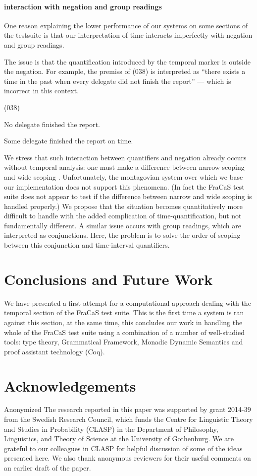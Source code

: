 \documentclass[a4paper,11pt]{article}
\newcommand\hyp{\item[H]}
\newcommand\fracasex[2]{\begin{lingex}\item[(#1)] \begin{subex} #2 \end{subex} \end{lingex} }
\begin{document}
\paragraph{interaction with negation and group readings}
One reason explaining the lower performance of our systems on some
sections of the testsuite is that our interpretation of time interacts
imperfectly with negation and group readings.

The issue is that the quantification introduced by the temporal marker
is outside the negation. For example, the premiss of (038) is
interpreted as ``there exists a time in the past when every delegate
did not finish the report'' --- which is incorrect in this context.
\fracasex{038}{
\item	No delegate finished the report.
\hyp 	Some delegate finished the report on time.
}
%
We stress that such interaction between quantifiers and negation
already occurs without temporal analysis: one must make a difference
between narrow scoping and wide scoping \cite{todo}. Unfortunately,
the montagovian system over which we base our implementation does not
support this phenomena. (In fact the FraCaS test suite does not appear to
test if the difference between narrow and wide scoping is handled properly.)
We propose that the situation becomes
quantitatively more difficult to handle with the added complication of
time-quantification, but not fundamentally different.
%
A similar issue occurs with group readings, which are interpreted as
conjunctions. Here, the problem is to solve the order of scoping
between this conjunction and time-interval quantifiers.

\section{Conclusions and Future Work}
We have presented a first attempt for a computational approach dealing with the temporal section of the FraCaS test suite. This is the first time a system is ran against this section, at the same time, this concludes our work in handling the whole of the FraCaS test suite using a combination of a number of well-studied tools: type theory, Grammatical Framework, Monadic Dynamic Semantics and proof assistant technology (Coq). 
\section*{Acknowledgements}

\ifanon
Anonymized
\else
The research reported in this paper was supported by grant 2014-39 from the
Swedish Research Council, which funds the Centre for Linguistic Theory and
Studies in Probability (CLASP) in the Department of Philosophy, Linguistics,
and Theory of Science at the University of Gothenburg. We are grateful to
our colleagues in CLASP for helpful discussion of some of the ideas presented
here. We also thank anonymous reviewers for their useful comments on an
earlier draft of the paper.
\fi

\end{document}
